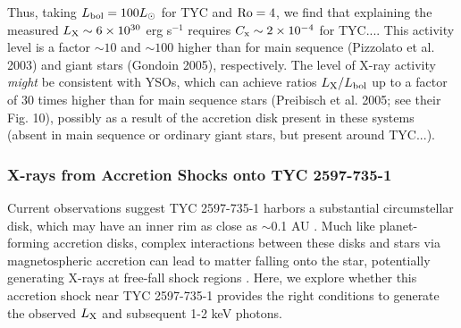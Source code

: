 \documentclass[linenumbers]{aastex631}
\begin{document}
Thus, taking $L_{\rm bol} = 100L_{\odot}$ for TYC and ${\rm Ro} = 4$, we find that explaining the measured $L_{\rm X} \sim 6\times 10^{30}$ erg s$^{-1}$ requires $C_{\rm x} \sim 2\times 10^{-4}$ for TYC....  This activity level is a factor $\sim 10$ and $\sim 100$ higher than for main sequence (Pizzolato et al. 2003) and giant stars (Gondoin 2005), respectively.  The level of X-ray activity {\it might} be consistent with YSOs, which can achieve ratios $L_{\rm X}/L_{\rm bol}$ up to a factor of 30 times higher than for main sequence stars (Preibisch et al. 2005; see their Fig. 10), possibly as a result of the accretion disk present in these systems (absent in main sequence or ordinary giant stars, but present around TYC...).



\subsubsection{X-rays from Accretion Shocks onto TYC 2597-735-1}

Current observations suggest TYC 2597-735-1 harbors a substantial circumstellar disk, which may have an inner rim as close as $\sim$0.1 AU \citep{2020Natur.587..387H}. Much like planet-forming accretion disks, complex interactions between these disks and stars via magnetospheric accretion can lead to matter falling onto the star, potentially generating X-rays at free-fall shock regions \citep[e.g.]{2007A&A...466.1111G}. Here, we explore whether this accretion shock near TYC 2597-735-1 provides the right conditions to generate the observed $L_{\rm X}$ and subsequent 1-2 keV photons.
\end{document}
